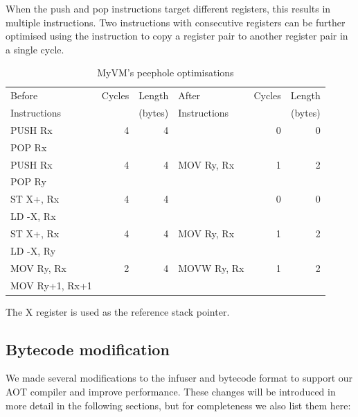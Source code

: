 When the push and pop instructions target different registers, this results in multiple  instructions. Two  instructions with consecutive registers can be further optimised using the  instruction to copy a register pair to another register pair in a single cycle.


\begin{table}[]
\centering
\caption{MyVM's peephole optimisations}
\label{tbl-myvm-peephole}
\begin{threeparttable}
\begin{tabular}{lrrlrr}
\toprule
Before & Cycles & Length & After & Cycles & Length \\
Instructions      & & (bytes) & Instructions      &  & (bytes) \\
\midrule
\midrule
PUSH Rx           & 4      & 4      &                   & 0      & 0 \\
POP Rx            &        &        &                   &        & \\
\midrule
PUSH Rx           & 4      & 4      & MOV Ry, Rx        & 1      & 2 \\
POP Ry            &        &        &                   &        & \\
\midrule
ST X+, Rx         & 4      & 4      &                   & 0      & 0 \\
LD -X, Rx         &        &        &                   &        & \\
\midrule
ST X+, Rx         & 4      & 4      & MOV Ry, Rx        & 1      & 2 \\
LD -X, Ry         &        &        &                   &        & \\
\midrule
MOV Ry, Rx        & 2      & 4      & MOVW Ry, Rx       & 1      & 2 \\
MOV Ry+1, Rx+1    &        &        &                   &        & \\
\bottomrule
\end{tabular}
\begin{tablenotes}
\item The X register is used as the reference stack pointer.
\end{tablenotes}
\end{threeparttable}
\end{table}


\subsection{Bytecode modification}
\label{sec-vm-design-bytecode-modifications}
We made several modifications to the infuser and bytecode format to support our AOT compiler and improve performance. These changes will be introduced in more detail in the following sections, but for completeness we also list them here:

